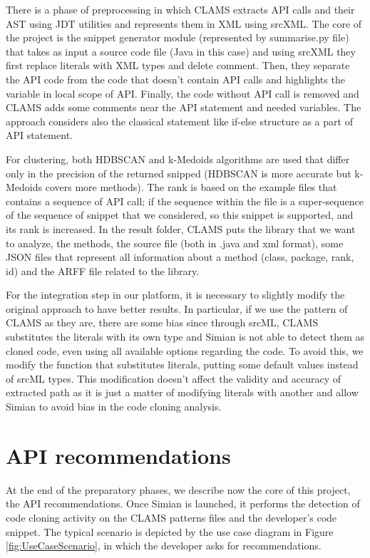 There is a phase of preprocessing in which CLAMS extracts API calls and their AST using JDT utilities and represents them in XML using srcXML. The core of the project is the snippet generator module (represented by summarise.py file) that takes as input a source code file (Java in this case) and using srcXML they first replace literals with XML types and delete comment. Then, they separate the API code from the code that doesn't contain API calls and highlights the variable in local scope of API. Finally, the code without API call is removed and CLAMS adds some comments near the API statement and needed variables. The approach considers also the classical statement like if-else structure as a part of API statement. 

For clustering, both HDBSCAN and k-Medoids algorithms are used that differ only in the precision of the returned snipped (HDBSCAN is more accurate but k-Medoids covers more methods). The rank is based on the example files that contains a sequence of API call; if the sequence within the file is a super-sequence of the sequence of snippet that we considered, so this snippet is supported, and its rank is increased. In the result folder, CLAMS puts the library that we want to analyze, the methods, the source file (both in .java and xml format), some JSON files that represent all information about a method (class, package, rank, id) and the ARFF file related to the library.

For the integration step in our platform, it is necessary to slightly modify the original approach to have better results. In particular, if we use the pattern of CLAMS as they are, there are some bias since through srcML, CLAMS substitutes the literals with its own type and Simian is not able to detect them as cloned code, even using all available options regarding the code. To avoid this, we modify the function that substitutes literals, putting some default values instead of srcML types. This modification doesn't affect the validity and accuracy of extracted path as it is just a matter of modifying literals with another and allow Simian to avoid bias in the code cloning analysis.

\section{API recommendations}

At the end of the preparatory phases, we describe now the core of this project, the API recommendations. Once Simian is launched, it performs the detection of code cloning activity on the CLAMS patterns files and the developer's code snippet. The typical scenario is depicted by the use case diagram in Figure \ref{fig:UseCaseScenario}, in which the developer asks for recommendations.


